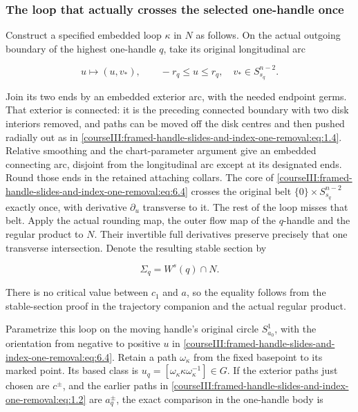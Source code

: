 \subsubsection{The loop that actually crosses the selected one-handle once}
\label{courseIII:framed-handle-slides-and-index-one-removal:section-6.2}

Construct a specified embedded loop \(\kappa\) in \(N\) as follows. On the actual outgoing boundary of the highest one-handle \(q\), take its original longitudinal arc

\begin{equation}
u\longmapsto (u,v_*),\qquad
       -r_q\leq u\leq r_q,\quad v_*\in S^{n-2}_{s_q}.
 \label{courseIII:framed-handle-slides-and-index-one-removal:eq:6.4}
\end{equation}

Join its two ends by an embedded exterior arc, with the needed endpoint germs. That exterior is connected: it is the preceding connected boundary with two disk interiors removed, and paths can be moved off the disk centres and then pushed radially out as in \eqref{courseIII:framed-handle-slides-and-index-one-removal:eq:1.4}. Relative smoothing and the chart-parameter argument give an embedded connecting arc, disjoint from the longitudinal arc except at its designated ends. Round those ends in the retained attaching collars. The core of \eqref{courseIII:framed-handle-slides-and-index-one-removal:eq:6.4} crosses the original belt \(\{0\}\times S^{n-2}_{s_q}\) exactly once, with derivative \(\partial_u\) transverse to it. The rest of the loop misses that belt. Apply the actual rounding map, the outer flow map of the \(q\)-handle and the regular product to \(N\). Their invertible full derivatives preserve precisely that one transverse intersection. Denote the resulting stable section by

\begin{equation}
\Sigma_q=W^s(q)\cap N.
 \label{courseIII:framed-handle-slides-and-index-one-removal:eq:6.5}
\end{equation}

There is no critical value between \(c_1\) and \(a\), so the equality follows from the stable-section proof in the trajectory companion and the actual regular product.

Parametrize this loop on the moving handle's original circle \(S^1_{a_0}\), with the orientation from negative to positive \(u\) in \eqref{courseIII:framed-handle-slides-and-index-one-removal:eq:6.4}. Retain a path \(\omega_\kappa\) from the fixed basepoint to its marked point. Its based class is
\(u_q=[\omega_\kappa\kappa\omega_\kappa^{-1}]\in G\).
If the exterior paths just chosen are \(c^\pm\), and the earlier paths in \eqref{courseIII:framed-handle-slides-and-index-one-removal:eq:1.2} are \(a_q^\pm\), the exact comparison in the one-handle body is

